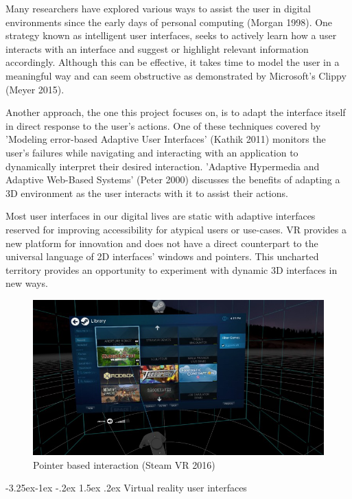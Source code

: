 \documentclass[12pt]{article}
\makeatletter
\renewcommand{\subsection}{\@startsection{subsection}{2}{\z@}%
             {-3.25ex\@plus -1ex \@minus -.2ex}%
             {1.5ex \@plus .2ex}%
             {\normalfont\large\scshape\bfseries}}
\makeatother
\begin{document}
Many researchers have explored various ways to assist the user in digital environments since the early days of personal computing (Morgan 1998). One strategy known as intelligent user interfaces, seeks to actively learn how a user interacts with an interface and suggest or highlight relevant information accordingly. Although this can be effective, it takes time to model the user in a meaningful way and can seem obstructive as demonstrated by Microsoft's Clippy (Meyer 2015).

Another approach, the one this project focuses on, is to adapt the interface itself in direct response to the user's actions. One of these techniques covered by 'Modeling error-based Adaptive User Interfaces' (Kathik 2011) monitors the user's failures while navigating and interacting with an application to dynamically interpret their desired interaction. 'Adaptive Hypermedia and Adaptive Web-Based Systems' (Peter 2000) discusses the benefits of adapting a 3D environment as the user interacts with it to assist their actions.

Most user interfaces in our digital lives are static with adaptive interfaces reserved for improving accessibility for atypical users or use-cases. VR provides a new platform for innovation and does not have a direct counterpart to the universal language of 2D interfaces' windows and pointers. This uncharted territory provides an opportunity to experiment with dynamic 3D interfaces in new ways.

\begin{figure}
\centering
  \includegraphics[width=.8\linewidth]{steamvr.jpg}
  \caption{Pointer based interaction (Steam VR 2016)}
\end{figure}

\subsection{Virtual reality user interfaces}
\end{document}
